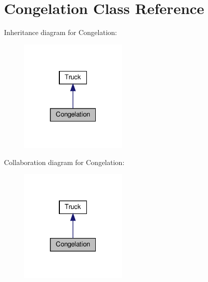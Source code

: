 \hypertarget{class_congelation}{}\section{Congelation Class Reference}
\label{class_congelation}


Inheritance diagram for Congelation\+:\nopagebreak
\begin{figure}[H]
\begin{center}
\leavevmode
\includegraphics[width=148pt]{class_congelation__inherit__graph}
\end{center}
\end{figure}


Collaboration diagram for Congelation\+:\nopagebreak
\begin{figure}[H]
\begin{center}
\leavevmode
\includegraphics[width=148pt]{class_congelation__coll__graph}
\end{center}
\end{figure}
